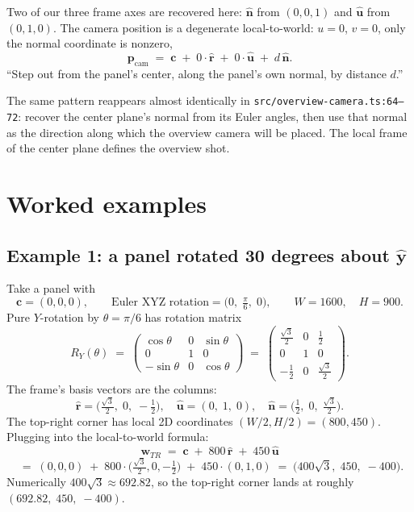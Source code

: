 \documentclass{article}
\begin{document}
Two of our three frame axes are recovered here: $\hat{\mathbf{n}}$ from
$(0,0,1)$ and $\hat{\mathbf{u}}$ from $(0,1,0)$. The camera position is a
degenerate local-to-world: $u = 0$, $v = 0$, only the normal coordinate is
nonzero,
\[
    \mathbf{p}_{\text{cam}} \;=\; \mathbf{c} \;+\; 0\cdot\hat{\mathbf{r}} \;+\; 0\cdot\hat{\mathbf{u}} \;+\; d\,\hat{\mathbf{n}}.
\]
``Step out from the panel's center, along the panel's own normal, by
distance $d$.''

The same pattern reappears almost identically in
\texttt{src/overview-camera.ts:64--72}: recover the center plane's normal
from its Euler angles, then use that normal as the direction along which the
overview camera will be placed. The local frame of the center plane defines
the overview shot.

\section{Worked examples}

\subsection*{Example 1: a panel rotated 30 degrees about $\hat{\mathbf{y}}$}

Take a panel with
\[
    \mathbf{c} = (0, 0, 0),
    \qquad
    \text{Euler XYZ rotation} = \bigl(0,\; \tfrac{\pi}{6},\; 0\bigr),
    \qquad
    W = 1600,\quad H = 900.
\]
Pure $Y$-rotation by $\theta = \pi/6$ has rotation matrix
\[
    R_Y(\theta) \;=\;
    \begin{pmatrix}
      \cos\theta & 0 & \sin\theta \\
      0          & 1 & 0          \\
      -\sin\theta & 0 & \cos\theta
    \end{pmatrix}
    \;=\;
    \begin{pmatrix}
      \tfrac{\sqrt{3}}{2} & 0 & \tfrac{1}{2} \\
      0                   & 1 & 0            \\
     -\tfrac{1}{2}        & 0 & \tfrac{\sqrt{3}}{2}
    \end{pmatrix}.
\]
The frame's basis vectors are the columns:
\[
    \hat{\mathbf{r}} = \bigl(\tfrac{\sqrt{3}}{2},\; 0,\; -\tfrac{1}{2}\bigr),
    \quad
    \hat{\mathbf{u}} = (0,\; 1,\; 0),
    \quad
    \hat{\mathbf{n}} = \bigl(\tfrac{1}{2},\; 0,\; \tfrac{\sqrt{3}}{2}\bigr).
\]
The top-right corner has local 2D coordinates $(W/2, H/2) = (800, 450)$.
Plugging into the local-to-world formula:
\[
    \mathbf{w}_{TR} \;=\; \mathbf{c} \;+\; 800\,\hat{\mathbf{r}} \;+\; 450\,\hat{\mathbf{u}}
\]
\[
    \;=\; (0,0,0) \;+\; 800\cdot\bigl(\tfrac{\sqrt{3}}{2},0,-\tfrac{1}{2}\bigr) \;+\; 450\cdot(0,1,0)
    \;=\; \bigl(400\sqrt{3},\; 450,\; -400\bigr).
\]
Numerically $400\sqrt{3} \approx 692.82$, so the top-right corner lands at
roughly $(692.82,\; 450,\; -400)$.
\end{document}
